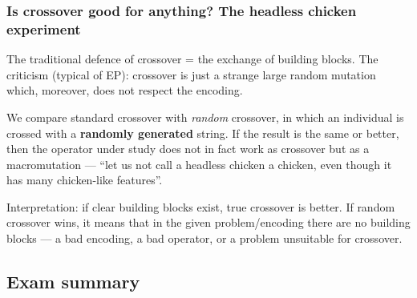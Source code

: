 \documentclass[11pt,a4paper]{article}
\theoremstyle{definition}
\providecommand{\uv}[1]{``#1''}
\begin{document}
\subsubsection{Is crossover good for anything? The headless chicken experiment}

The traditional defence of crossover = the exchange of building blocks. The
criticism (typical of EP): crossover is just a strange large random mutation
which, moreover, does not respect the encoding.

\begin{defbox}
We compare standard crossover with \emph{random} crossover, in which an
individual is crossed with a \textbf{randomly generated} string. If the result
is the same or better, then the operator under study does not in fact work as
crossover but as a macromutation --- \uv{let us not call a headless chicken a
chicken, even though it has many chicken-like features}.
\end{defbox}

Interpretation: if clear building blocks exist, true crossover is better. If
random crossover wins, it means that in the given problem/encoding there are no
building blocks --- a bad encoding, a bad operator, or a problem unsuitable for
crossover.

\subsection{Exam summary}
\end{document}
